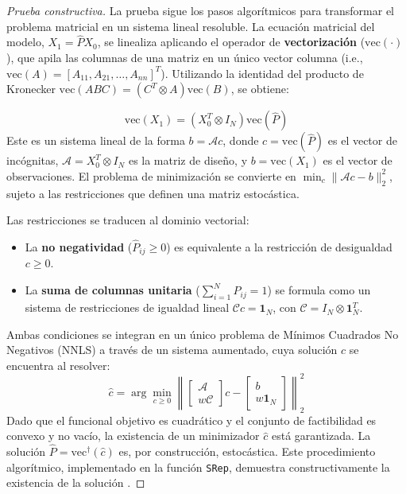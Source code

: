 \begin{proof}[Prueba constructiva]


La prueba sigue los pasos algorítmicos para transformar el problema matricial en un sistema lineal resoluble. La ecuación matricial del modelo, \(X_1 = \hat{P} X_0\), se linealiza aplicando el operador de \textbf{vectorización} (\(\text{vec}(\cdot)\)), que apila las columnas de una matriz en un único vector columna (i.e., \(\text{vec}(A)=[A_{11}, A_{21}, \dots, A_{nn}]^T\)). Utilizando la identidad del producto de Kronecker \(\text{vec}(ABC) = (C^T \otimes A)\text{vec}(B)\), se obtiene:

\begin{equation}
\text{vec}(X_1) = (X_0^T \otimes I_N) \text{vec}(\hat{P})
\end{equation}
Este es un sistema lineal de la forma \(b = \mathcal{A}c\), donde \(c = \text{vec}(\hat{P})\) es el vector de incógnitas, \(\mathcal{A} = X_0^T \otimes I_N\) es la matriz de diseño, y \(b = \text{vec}(X_1)\) es el vector de observaciones. El problema de minimización se convierte en \(\min_{c} \|\mathcal{A}c - b\|_2^2\), sujeto a las restricciones que definen una matriz estocástica.

Las restricciones se traducen al dominio vectorial:
\begin{itemize}
    \item La \textbf{no negatividad} (\(\hat{P}_{ij} \geq 0\)) es equivalente a la restricción de desigualdad \(c \ge 0\).
    \item La \textbf{suma de columnas unitaria} (\(\sum_{i=1}^N \hat{P}_{ij} = 1\)) se formula como un sistema de restricciones de igualdad lineal \(\mathcal{C}c = \mathbf{1}_N\), con \(\mathcal{C} = I_N \otimes \mathbf{1}_N^T\).
\end{itemize}
Ambas condiciones se integran en un único problema de Mínimos Cuadrados No Negativos (NNLS) a través de un sistema aumentado, cuya solución \(\hat{c}\) se encuentra al resolver:
\begin{equation}
\hat{c} = \arg\min_{c \geq 0} \left\| \begin{bmatrix} \mathcal{A} \\ w\mathcal{C} \end{bmatrix} c - \begin{bmatrix} b \\ w\mathbf{1}_N \end{bmatrix} \right\|_2^2
\label{eq:nnls_final_problem}
\end{equation}
Dado que el funcional objetivo es cuadrático y el conjunto de factibilidad es convexo y no vacío, la existencia de un minimizador \(\hat{c}\) está garantizada. La solución \(\hat{P} = \text{vec}^\dagger(\hat{c})\) es, por construcción, estocástica. Este procedimiento algorítmico, implementado en la función \texttt{SRep}, demuestra constructivamente la existencia de la solución \cite{BanegasVides2025, vides_lopez_srep_2025}.
\end{proof}

